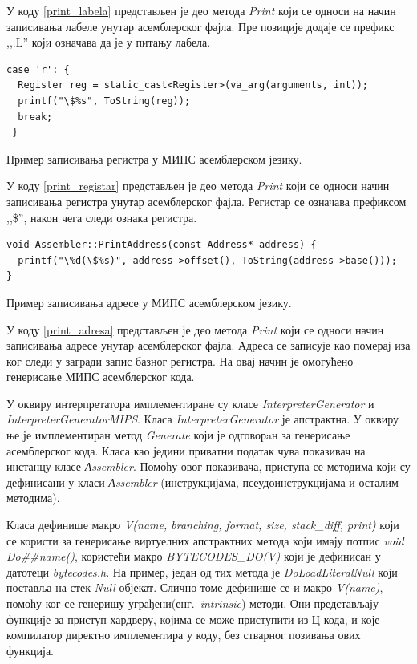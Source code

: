 \documentclass[12pt,oneside]{memoir}
\begin{document}
У коду \ref{print_labela} представљен је део метода \textit{Print} који се односи на начин записивања лабеле унутар асемблерског фајла. Пре позиције додаје се префикс ,,.L'' који означава да је у питању лабела.

\begin{listing}
\begin{verbatim}
case 'r': {
  Register reg = static_cast<Register>(va_arg(arguments, int));
  printf("\$%s", ToString(reg));
  break;
 }
\end{verbatim}
\caption{Пример записивања регистра у МИПС асемблерском језику.}
\label{print_registar}
\end{listing}
У коду \ref{print_registar} представљен је део метода \textit{Print} који се односи начин записивања регистра унутар асемблерског фајла. Регистар се означава префиксом ,,\$'', након чега следи ознака регистра.

\begin{listing}
\begin{verbatim}
void Assembler::PrintAddress(const Address* address) {
  printf("\%d(\$%s)", address->offset(), ToString(address->base()));
}
\end{verbatim}
\caption{Пример записивања адресе у МИПС асемблерском језику.}
\label{print_adresa}
\end{listing}
У коду \ref{print_adresa} представљен је део метода \textit{Print} који се односи начин записивања адресе унутар асемблерског фајла. Адреса се записује као померај иза ког следи у загради запис базног регистра. На овај начин је омогућено генерисање МИПС асемблерског кода. 

У оквиру интерпретатора имплементиране су класе \textit{InterpreterGenerator} и \textit{InterpreterGeneratorMIPS}. Класа \textit{InterpreterGenerator} је апстрактна. У оквиру ње је имплементиран метод \textit{Generate} који је одговорaн за генерисање асемблерског кода. Класа као једини приватни податак чува показивач на инстанцу класе \textit{Аssembler}. Помоћу овог показивача, приступа се методима који су дефинисани у класи \textit{Аssembler} (инструкцијама, псеудоинструкцијама и осталим методима).

Класа дефинише макро \textit{V(name, branching, format, size, stack\_diff, print)} који се користи за генерисање виртуелних апстрактних метода који имају потпис \textit{void Do\#\#name()}, користећи макро \textit{BYTECODES\_DO(V)} који је дефинисан у датотеци \textit{bytecodes.h}. На пример, један од тих метода је \textit{DoLoadLiteralNull} који поставља на стек \textit{Null} објекат. Слично томе дефинише се и макро \textit{V(name)}, помоћу ког се генеришу уграђени(енг.~\textit{intrinsic}) методи. Они представљају функције за приступ хардверу, којима се може приступити из Ц кода, и које компилатор директно имплементира у коду, без стварног позивања ових функција.
\end{document}
